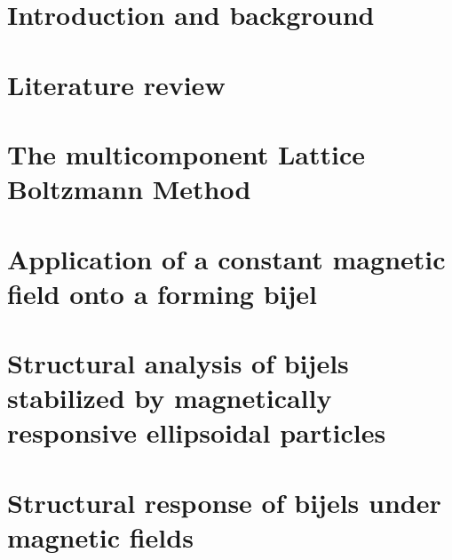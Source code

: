 \documentclass{udthesis}
\begin{document}


% 

% 

\chapter{Introduction and background}
\label{chapter:introduction}


\chapter{Literature review}
\label{chapter:lit_review}


\chapter{The multicomponent Lattice Boltzmann Method}
\label{chapter:methods_chapter}

% 
% 

\chapter{Application of a constant magnetic field onto a forming bijel}
\label{chapter:aim1}


\chapter{Structural analysis of bijels stabilized by magnetically responsive ellipsoidal particles}
\label{chapter:aim1_5}


\chapter{Structural response of bijels under magnetic fields}
\label{chapter:aim2}

\end{document}
